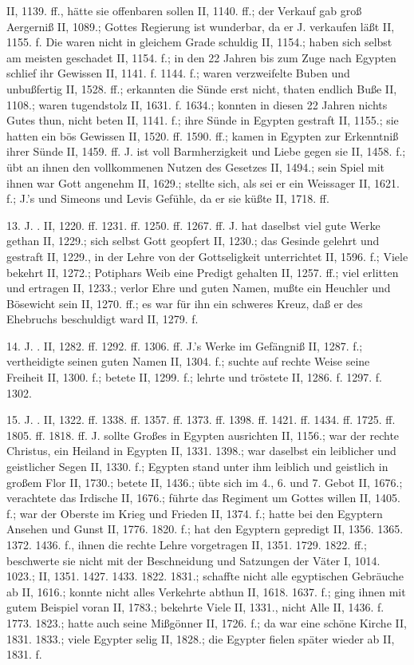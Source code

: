 II, 1139. ff., hätte sie offenbaren sollen II, 1140. ff.; der Verkauf gab groß Aergerniß II, 1089.; Gottes Regierung ist wunderbar, da er J. verkaufen läßt II, 1155. f. Die  waren nicht in gleichem Grade schuldig II, 1154.; haben sich selbst am meisten geschadet II, 1154. f.; in den 22 Jahren bis zum Zuge nach Egypten schlief ihr Gewissen II, 1141. f. 1144. f.; waren verzweifelte Buben und unbußfertig II, 1528. ff.; erkannten die Sünde erst nicht, thaten endlich Buße II, 1108.; waren tugendstolz II, 1631. f. 1634.; konnten in diesen 22 Jahren nichts Gutes thun, nicht beten II, 1141. f.; ihre Sünde in Egypten gestraft II, 1155.; sie hatten ein bös Gewissen II, 1520. ff. 1590. ff.; kamen in Egypten zur Erkenntniß ihrer Sünde II, 1459. ff. J. ist voll Barmherzigkeit und Liebe gegen sie II, 1458. f.; übt an ihnen den vollkommenen Nutzen des Gesetzes II, 1494.; sein Spiel mit ihnen war Gott angenehm II, 1629.; stellte sich, als sei er ein Weissager II, 1621. f.; J.’s und Simeons und Levis Gefühle, da er sie küßte II, 1718. ff.

13. J. . II, 1220. ff. 1231. ff. 1250. ff. 1267. ff. J. hat daselbst viel gute Werke gethan II, 1229.; sich selbst Gott geopfert II, 1230.; das Gesinde gelehrt und gestraft II, 1229., in der Lehre von der Gottseligkeit unterrichtet II, 1596. f.; Viele bekehrt II, 1272.; Potiphars Weib eine Predigt gehalten II, 1257. ff.; viel erlitten und ertragen II, 1233.; verlor Ehre und guten Namen, mußte ein Heuchler und Bösewicht sein II, 1270. ff.; es war für ihn ein schweres Kreuz, daß er des Ehebruchs beschuldigt ward II, 1279. f.

14. J. . II, 1282. ff. 1292. ff. 1306. ff. J.’s Werke im Gefängniß II, 1287. f.; vertheidigte seinen guten Namen II, 1304. f.; suchte auf rechte Weise seine Freiheit II, 1300. f.; betete II, 1299. f.; lehrte und tröstete II, 1286. f. 1297. f. 1302.

15. J. . II, 1322. ff. 1338. ff. 1357. ff. 1373. ff. 1398. ff. 1421. ff. 1434. ff. 1725. ff. 1805. ff. 1818. ff. J. sollte Großes in Egypten ausrichten II, 1156.; war der rechte Christus, ein Heiland in Egypten II, 1331. 1398.; war daselbst ein leiblicher und geistlicher Segen II, 1330. f.; Egypten stand unter ihm leiblich und geistlich in großem Flor II, 1730.; betete II, 1436.; übte sich im 4., 6. und 7. Gebot II, 1676.; verachtete das Irdische II, 1676.; führte das Regiment um Gottes willen II, 1405. f.; war der Oberste im Krieg und Frieden II, 1374. f.; hatte bei den Egyptern Ansehen und Gunst II, 1776. 1820. f.; hat den Egyptern gepredigt II, 1356. 1365. 1372. 1436. f., ihnen die rechte Lehre vorgetragen II, 1351. 1729. 1822. ff.; beschwerte sie nicht mit der Beschneidung und Satzungen der Väter I, 1014. 1023.; II, 1351. 1427. 1433. 1822. 1831.; schaffte nicht alle egyptischen Gebräuche ab II, 1616.; konnte nicht alles Verkehrte abthun II, 1618. 1637. f.; ging ihnen mit gutem Beispiel voran II, 1783.; bekehrte Viele II, 1331., nicht Alle II, 1436. f. 1773. 1823.; hatte auch seine Mißgönner II, 1726. f.; da war eine schöne Kirche II, 1831. 1833.; viele Egypter selig II, 1828.; die Egypter fielen später wieder ab II, 1831. f.

